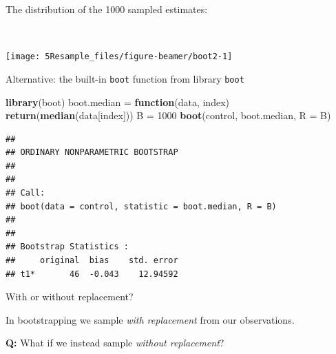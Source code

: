 \documentclass[
  10pt,
  ignorenonframetext,
]{beamer}
\newenvironment{Shaded}{\begin{snugshade}}{\end{snugshade}}
\newcommand{\AttributeTok}[1]{\textcolor[rgb]{0.13,0.29,0.53}{#1}}
\newcommand{\ControlFlowTok}[1]{\textcolor[rgb]{0.13,0.29,0.53}{\textbf{#1}}}
\newcommand{\DecValTok}[1]{\textcolor[rgb]{0.00,0.00,0.81}{#1}}
\newcommand{\FunctionTok}[1]{\textcolor[rgb]{0.13,0.29,0.53}{\textbf{#1}}}
\newcommand{\NormalTok}[1]{#1}
\newcommand{\OtherTok}[1]{\textcolor[rgb]{0.56,0.35,0.01}{#1}}
\begin{document}
\begin{frame}
The distribution of the 1000 sampled estimates:

\(~\)

\begin{center}\texttt{[image: 5Resample\_files/figure-beamer/boot2-1]} \end{center}
\end{frame}

\begin{frame}[fragile]
\begin{block}{Alternative: the built-in \texttt{boot} function from
library \texttt{boot}}
\protect\hypertarget{alternative-the-built-in-boot-function-from-library-boot}{}
\(~\)

\scriptsize

\begin{Shaded}
\begin{Highlighting}[]
\FunctionTok{library}\NormalTok{(boot)}
\NormalTok{boot.median }\OtherTok{=} \ControlFlowTok{function}\NormalTok{(data, index) }\FunctionTok{return}\NormalTok{(}\FunctionTok{median}\NormalTok{(data[index]))}
\NormalTok{B }\OtherTok{=} \DecValTok{1000}
\FunctionTok{boot}\NormalTok{(control, boot.median, }\AttributeTok{R =}\NormalTok{ B)}
\end{Highlighting}
\end{Shaded}

\begin{verbatim}
## 
## ORDINARY NONPARAMETRIC BOOTSTRAP
## 
## 
## Call:
## boot(data = control, statistic = boot.median, R = B)
## 
## 
## Bootstrap Statistics :
##     original  bias    std. error
## t1*       46  -0.043    12.94592
\end{verbatim}
\end{block}
\end{frame}

\begin{frame}
\begin{block}{With or without replacement?}
\protect\hypertarget{with-or-without-replacement}{}
\vspace{2mm}

In bootstrapping we sample \emph{with replacement} from our
observations.

\vspace{4mm}

\textbf{Q:} What if we instead sample \emph{without replacement}?

\vspace{2mm}

\vspace{4mm}
\end{block}
\end{frame}
\end{document}
